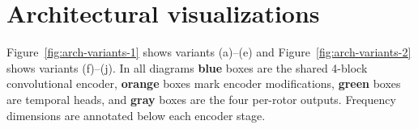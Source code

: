 \documentclass[11pt,a4paper]{article}
\begin{document}
\section{Architectural visualizations}

Figure~\ref{fig:arch-variants-1} shows variants (a)--(e) and Figure~\ref{fig:arch-variants-2} shows variants (f)--(j).
In all diagrams \textbf{blue} boxes are the shared 4-block convolutional encoder,
\textbf{orange} boxes mark encoder modifications, \textbf{green} boxes are temporal heads,
and \textbf{gray} boxes are the four per-rotor outputs.
Frequency dimensions are annotated below each encoder stage.

\newcommand{\shapetext}[1]{{\tiny\color{gray!70!black}#1}}
\end{document}
